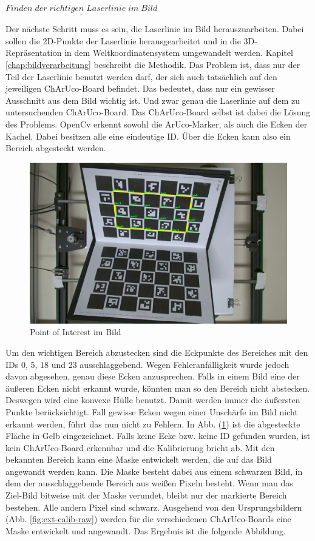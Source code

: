 		$\underline{Finden \; der \; richtigen \; Laserlinie \; im \; Bild}$
		
		Der nächste Schritt muss es sein, die Laserlinie im Bild herauszuarbeiten. Dabei sollen die 2D-Punkte der Laserlinie herausgearbeitet und in die 3D-Repräsentation in dem Weltkoordinatensystem umgewandelt werden. Kapitel \ref{chap:bildverarbeitung} beschreibt die Methodik. Das Problem ist, dass nur der Teil der Laserlinie benutzt werden darf, der sich auch tatsächlich auf den jeweiligen ChArUco-Board befindet. Das bedeutet, dass nur ein gewisser Ausschnitt aus dem Bild wichtig ist. Und zwar genau die Laserlinie auf dem zu untersuchenden ChArUco-Board. \newline
		Das ChArUco-Board selbst ist dabei die Lösung des Problems. OpenCv erkennt sowohl die ArUco-Marker, als auch die Ecken der Kachel. Dabei besitzen alle eine eindeutige ID. Über die Ecken kann also ein Bereich abgesteckt werden.
		
		\begin{figure}[h]
			\centering
			\includegraphics[width=0.8\linewidth]{img/hauptteil/ext-calib/charuco_convex_hull_primary.png}
			\caption{Point of Interest im Bild}
			\label{fig:ext-calib-hull}
		\end{figure}
	
		Um den wichtigen Bereich abzustecken sind die Eckpunkte des Bereiches mit den IDs 0, 5, 18 und 23 ausschlaggebend. Wegen Fehleranfälligkeit wurde jedoch davon abgesehen, genau diese Ecken anzusprechen. Falls in einem Bild eine der äußeren Ecken nicht erkannt wurde, könnten man so den Bereich nicht abstecken. Deswegen wird eine konvexe Hülle benutzt. Damit werden immer die äußersten Punkte berücksichtigt. Fall gewisse Ecken wegen einer Unschärfe im Bild nicht erkannt werden, führt das nun nicht zu Fehlern. In Abb. (\ref{fig:ext-calib-hull}) ist die abgesteckte Fläche in Gelb eingezeichnet. Falls keine Ecke bzw. keine ID gefunden wurden, ist kein ChArUco-Board erkennbar und die Kalibrierung bricht ab. \newline
		Mit den bekannten Bereich kann eine Maske entwickelt werden, die auf das Bild angewandt werden kann. Die Maske besteht dabei aus einem schwarzen Bild, in dem der ausschlaggebende Bereich aus weißen Pixeln besteht. Wenn man das Ziel-Bild bitweise mit der Maske verundet, bleibt nur der markierte Bereich bestehen. Alle andern Pixel sind schwarz. Ausgehend von den Ursprungsbildern (Abb. \ref{fig:ext-calib-raw}) werden für die verschiedenen ChArUco-Boards eine Maske entwickelt und angewandt. Das Ergebnis ist die folgende Abbildung.
		
